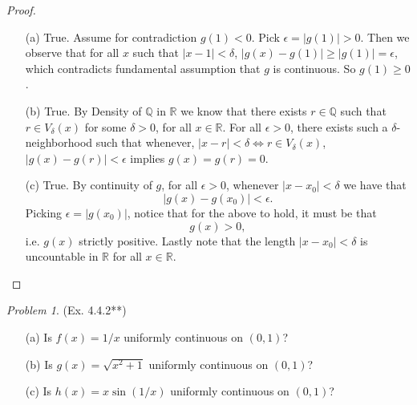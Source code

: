 \documentclass[11pt,twoside, reqno]{amsart}
\theoremstyle{remark}
\newtheorem{Prob}{Problem}
\def\R{\mathbb R}
\def\Q{\mathbb Q}
\renewcommand{\iff}{\Leftrightarrow}
\begin{document}
\begin{proof}
\begin{enumerate}
    \item [(a)] True. Assume for contradiction $g(1) < 0$. Pick $\epsilon = |g(1)| > 0$. Then we observe that for all $x$ such that $|x - 1| < \delta$, $|g(x) - g(1)| \geq |g(1)| = \epsilon$, which contradicts fundamental assumption that $g$ is continuous. So $g(1) \geq 0$.
    \item [(b)] True. By Density of $\Q$ in $\R$ we know that there exists $r \in \Q$ such that $r \in V_\delta(x)$ for some $\delta > 0$, for all $x \in \R$. For all $\epsilon > 0$, there exists such a $\delta$-neighborhood such that whenever, $|x - r| < \delta \iff r \in V_\delta(x)$, $|g(x) - g(r)| < \epsilon$ implies $g(x) = g(r) = 0$.
    \item [(c)] True. By continuity of $g$, for all $\epsilon > 0$, whenever $|x - x_0| < \delta$ we have that 
    $$
        |g(x) - g(x_0)| < \epsilon.
    $$
    Picking $\epsilon = |g(x_0)|$, notice that for the above to hold, it must be that
    $$
        g(x) > 0,
    $$
    i.e. $g(x)$ strictly positive. Lastly note that the length $|x - x_0| < \delta$ is uncountable in $\R$ for all $x \in \R$.
\end{enumerate}

\end{proof}

\begin{Prob}(Ex. 4.4.2**)
\begin{enumerate}
    \item [(a)] Is $f(x) = 1/x$ uniformly continuous on $(0,1)$?
    \item [(b)] Is $g(x) = \sqrt{x^2 + 1}$ uniformly continuous on $(0,1)$?
    \item [(c)] Is $h(x) = x\sin(1/x)$ uniformly continuous on $(0,1)$?
\end{enumerate}
\end{Prob}
\end{document}
